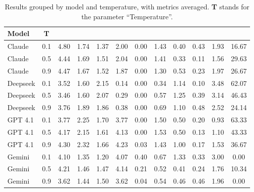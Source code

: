 \documentclass[12pt,a4paper,openright,twoside]{book}
\begin{document}
\begin{table}[htbp]
    \centering
    \footnotesize
    \begin{tabular}{l|c|ccccccccc|c}%
        \toprule
        \textbf{Model} & \textbf{T} & \PC{} & \CC{} & \PBC{} & \GC{} & \RR{} & \NGC{} & \NBC{} & \GSA{} & \BSA{} & \TSR{} \\  
        \midrule
        Claude & 0.1 & 4.80 & 1.74 & 1.37 & 2.00 & 0.00 & 1.43 & 0.40 & 0.43 & 1.93 & 16.67 \\
        Claude & 0.5 & 4.44 & 1.69 & 1.51 & 2.04 & 0.00 & 1.41 & 0.33 & 0.11 & 1.56 & 29.63 \\
        Claude & 0.9 & 4.47 & 1.67 & 1.52 & 1.87 & 0.00 & 1.30 & 0.53 & 0.23 & 1.97 & 26.67 \\
        Deepseek & 0.1 & 3.52 & 1.60 & 2.15 & 0.14 & 0.00 & 0.34 & 1.14 & 0.10 & 3.48 & 62.07 \\
        Deepseek & 0.5 & 3.46 & 1.60 & 2.07 & 0.29 & 0.00 & 0.57 & 1.25 & 0.39 & 3.14 & 46.43 \\
        Deepseek & 0.9 & 3.76 & 1.89 & 1.86 & 0.38 & 0.00 & 0.69 & 1.10 & 0.48 & 2.52 & 24.14 \\
        GPT 4.1 & 0.1 & 3.77 & 2.25 & 1.70 & 3.77 & 0.00 & 1.50 & 0.50 & 0.20 & 0.93 & 63.33 \\
        GPT 4.1 & 0.5 & 4.17 & 2.15 & 1.61 & 4.13 & 0.00 & 1.53 & 0.50 & 0.13 & 1.10 & 43.33 \\
        GPT 4.1 & 0.9 & 4.30 & 2.32 & 1.66 & 4.23 & 0.03 & 1.43 & 1.00 & 0.17 & 1.53 & 36.67 \\
        Gemini & 0.1 & 4.10 & 1.35 & 1.20 & 4.07 & 0.40 & 0.67 & 1.33 & 0.33 & 3.00 & 0.00 \\
        Gemini & 0.5 & 4.21 & 1.46 & 1.47 & 4.14 & 0.21 & 0.52 & 0.41 & 0.24 & 1.76 & 10.34 \\
        Gemini & 0.9 & 3.62 & 1.44 & 1.50 & 3.62 & 0.04 & 0.54 & 0.46 & 0.46 & 1.96 & 0.00 \\
        \bottomrule
    \end{tabular}
    \caption{Results grouped by model and temperature, with metrics averaged. \textbf{T} stands for the parameter ``Temperature''.}
    \label{tab:byTempAndModel}
\end{table}
\end{document}
